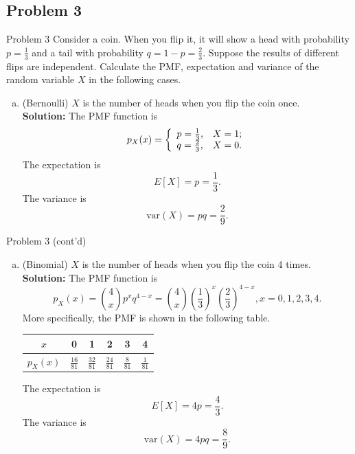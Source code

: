 \documentclass{beamer}
\begin{document}
\subsection{Problem 3}
\begin{frame}{Problem 3}
Consider a coin. When you flip it, it will show a head with probability $p=\frac{1}{3}$ and a tail
     with probability $q=1-p=\frac{2}{3}$. Suppose the results of different flips are independent.
        Calculate the PMF, expectation and variance of the random variable $X$ in the following cases.
        \begin{enumerate}[(a)]
            \item (Bernoulli) $X$ is the number of heads when you flip the coin once. \\
            {\bf Solution:} The PMF function is
            \begin{equation}
            \nonumber
            p_{X}(x) = \left\{
                         \begin{array}{ll}
                           p=\frac{1}{3}, & \hbox{$X=1$;} \\
                           q=\frac{2}{3}, & \hbox{$X=0$.}
                         \end{array}
                       \right.
            \end{equation}
            The expectation is \[E[X] = p = \frac{1}{3}.\]
            The variance is \[\text{var}(X) = pq = \frac{2}{9}.\]
        \end{enumerate}
\end{frame}
\begin{frame}{Problem 3 (cont'd)}
    \begin{enumerate}[(b)]
        \item (Binomial)  $X$ is the number of heads when you flip the coin 4 times. \\

        {\bf Solution:} The PMF function is \[p_X(x)=\binom{4}{x}p^xq^{4-x} = \binom{4}{x}\left(\frac{1}{3}\right)^x
         \left(\frac{2}{3}\right)^{4-x}, x=0,1,2,3,4.\] More specifically,
        the PMF is shown in the following table.
        \begin{center}
        \begin{tabular}{|c|c|c|c|c|c|}
          \hline
          $x$ & 0 & 1 & 2 & 3 & 4 \\
          \hline
          $p_{X}(x)$ & $\frac{16}{81}$ & $\frac{32}{81}$ & $\frac{24}{81}$ & $\frac{8}{81}$ & $\frac{1}{81}$ \\
          \hline
        \end{tabular}
        \end{center}

        The expectation is \[E[X] = 4p = \frac{4}{3}.\]
        The variance is \[\text{var}(X)=4pq = \frac{8}{9}.\]
    \end{enumerate}
\end{frame}
\end{document}
